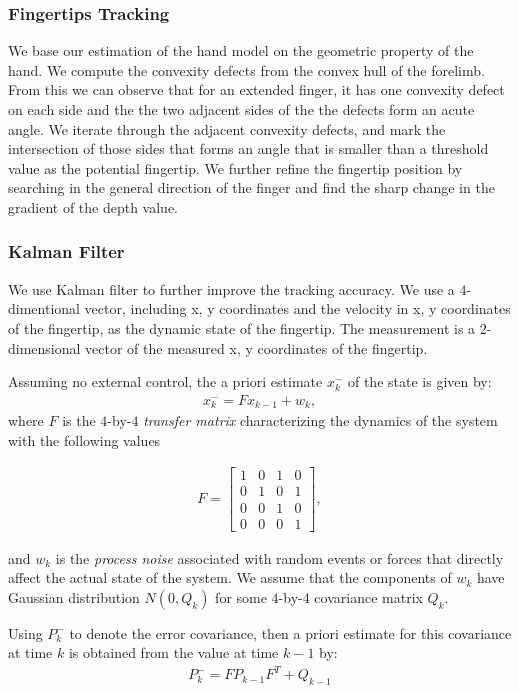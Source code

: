 \subsubsection{Fingertips Tracking}
We base our estimation of the hand model on the geometric property of the
hand. We compute the convexity defects from the convex hull of the forelimb.
From this we can observe that for an extended finger, it has one convexity
defect on each side and the the two adjacent sides of the the defects form an
acute angle. We iterate through the adjacent convexity defects, and mark the
intersection of those sides that forms an angle that is smaller than a threshold
value as the potential fingertip. We further refine the fingertip position by
searching in the general direction of the finger and find the sharp change in
the gradient of the depth value.


\subsubsection{Kalman Filter}
We use Kalman filter to further improve the tracking accuracy. We use a
$4$-dimentional vector, including x, y coordinates and the velocity in x, y
coordinates of the fingertip, as the dynamic state of the fingertip.
The measurement is a $2$-dimensional vector of the measured x, y
coordinates of the fingertip. 

Assuming no external control, the a priori estimate $x_k^-$ of the state is
given by:
\begin{align*}
x_k^- = Fx_{k - 1} + w_k,
\end{align*}
where $F$ is the $4$-by-$4$ \textit{transfer matrix} characterizing the
dynamics of the system with the following values

\begin{align*}
F = \left[ \begin{array}{cccc}
	1 & 0 & 1 & 0 \\
	0 & 1 & 0 & 1 \\
	0 & 0 & 1 & 0 \\
	0 & 0 & 0 & 1 \end{array} \right],
\end{align*}

and $w_k$ is the
\textit{process noise} associated with random events or forces that directly affect the actual state of the system. We assume that the components of $w_k$
have Gaussian distribution $N(0, Q_k)$ for some $4$-by-$4$ covariance matrix
$Q_k$.

Using $P_k^-$ to denote the error covariance, then a priori estimate for this
covariance at time $k$ is obtained from the value at time $k - 1$ by:
\begin{align*}
P_k^- = FP_{k - 1}F^T + Q_{k - 1}
\end{align*}

